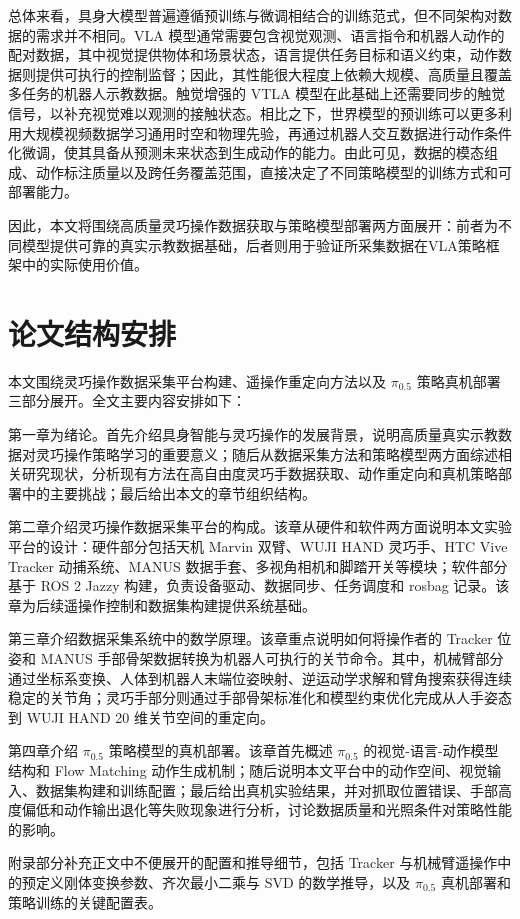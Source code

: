 总体来看，具身大模型普遍遵循预训练与微调相结合的训练范式，但不同架构对数据的需求并不相同。VLA 模型通常需要包含视觉观测、语言指令和机器人动作的配对数据，其中视觉提供物体和场景状态，语言提供任务目标和语义约束，动作数据则提供可执行的控制监督；因此，其性能很大程度上依赖大规模、高质量且覆盖多任务的机器人示教数据。触觉增强的 VTLA 模型在此基础上还需要同步的触觉信号，以补充视觉难以观测的接触状态。相比之下，世界模型的预训练可以更多利用大规模视频数据学习通用时空和物理先验，再通过机器人交互数据进行动作条件化微调，使其具备从预测未来状态到生成动作的能力。由此可见，数据的模态组成、动作标注质量以及跨任务覆盖范围，直接决定了不同策略模型的训练方式和可部署能力。

因此，本文将围绕高质量灵巧操作数据获取与策略模型部署两方面展开：前者为不同模型提供可靠的真实示教数据基础，后者则用于验证所采集数据在VLA策略框架中的实际使用价值。

\section{论文结构安排}

本文围绕灵巧操作数据采集平台构建、遥操作重定向方法以及 $\pi_{0.5}$ 策略真机部署三部分展开。全文主要内容安排如下：

第一章为绪论。首先介绍具身智能与灵巧操作的发展背景，说明高质量真实示教数据对灵巧操作策略学习的重要意义；随后从数据采集方法和策略模型两方面综述相关研究现状，分析现有方法在高自由度灵巧手数据获取、动作重定向和真机策略部署中的主要挑战；最后给出本文的章节组织结构。

第二章介绍灵巧操作数据采集平台的构成。该章从硬件和软件两方面说明本文实验平台的设计：硬件部分包括天机 Marvin 双臂、WUJI HAND 灵巧手、HTC Vive Tracker 动捕系统、MANUS 数据手套、多视角相机和脚踏开关等模块；软件部分基于 ROS 2 Jazzy 构建，负责设备驱动、数据同步、任务调度和 rosbag 记录。该章为后续遥操作控制和数据集构建提供系统基础。

第三章介绍数据采集系统中的数学原理。该章重点说明如何将操作者的 Tracker 位姿和 MANUS 手部骨架数据转换为机器人可执行的关节命令。其中，机械臂部分通过坐标系变换、人体到机器人末端位姿映射、逆运动学求解和臂角搜索获得连续稳定的关节角；灵巧手部分则通过手部骨架标准化和模型约束优化完成从人手姿态到 WUJI HAND 20 维关节空间的重定向。

第四章介绍 $\pi_{0.5}$ 策略模型的真机部署。该章首先概述 $\pi_{0.5}$ 的视觉-语言-动作模型结构和 Flow Matching 动作生成机制；随后说明本文平台中的动作空间、视觉输入、数据集构建和训练配置；最后给出真机实验结果，并对抓取位置错误、手部高度偏低和动作输出退化等失败现象进行分析，讨论数据质量和光照条件对策略性能的影响。

附录部分补充正文中不便展开的配置和推导细节，包括 Tracker 与机械臂遥操作中的预定义刚体变换参数、齐次最小二乘与 SVD 的数学推导，以及 $\pi_{0.5}$ 真机部署和策略训练的关键配置表。
